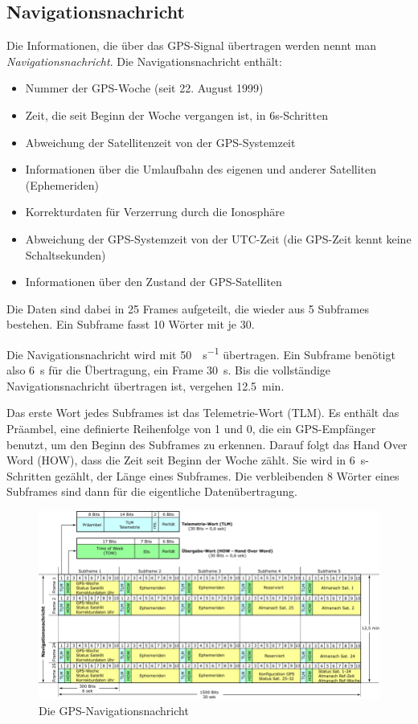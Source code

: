 \documentclass[12pt,a4paper]{scrartcl}
\begin{document}
\subsection{Navigationsnachricht}
Die Informationen, die über das GPS-Signal übertragen werden nennt man \emph{Navigationsnachricht}. Die Navigationsnachricht enthält:
\begin{itemize}
\item Nummer der GPS-Woche (seit 22. August 1999)
\item Zeit, die seit Beginn der Woche vergangen ist, in 6s-Schritten
\item Abweichung der Satellitenzeit von der GPS-Systemzeit
\item Informationen über die Umlaufbahn des eigenen und anderer Satelliten (Ephemeriden)
\item Korrekturdaten für Verzerrung durch die Ionosphäre
\item Abweichung der GPS-Systemzeit von der UTC-Zeit (die GPS-Zeit kennt keine Schaltsekunden)
\item Informationen über den Zustand der GPS-Satelliten
\end{itemize}
\cite{infotip_gps}

Die Daten sind dabei in 25 Frames aufgeteilt, die wieder aus 5 Subframes bestehen. Ein Subframe fasst 10 Wörter mit je \SI{30}{\bit}.

Die Navigationsnachricht wird mit \SI{50}{\bit\per\second} übertragen.
Ein Subframe benötigt also \SI{6}{\second} für die Übertragung, ein Frame \SI{30}{\second}. Bis die vollständige Navigationsnachricht übertragen ist, vergehen \SI{12.5}{\minute}.

Das erste Wort jedes Subframes ist das Telemetrie-Wort (TLM). Es enthält das Präambel, eine definierte Reihenfolge von 1 und 0, die ein GPS-Empfänger benutzt, um den Beginn des Subframes zu erkennen.  Darauf folgt das Hand Over Word (HOW), dass die Zeit seit Beginn der Woche zählt. Sie wird in \SI{6}{\second}-Schritten gezählt, der Länge eines Subframes. Die verbleibenden 8 Wörter eines Subframes sind dann für die eigentliche Datenübertragung.

\begin{figure}[H]
\centering
\includegraphics[width=\textwidth]{img/navigation_message.png}
\caption{Die GPS-Navigationsnachricht\cite{infotip_gps}}
\label{fig:nm}
\end{figure}
\end{document}
